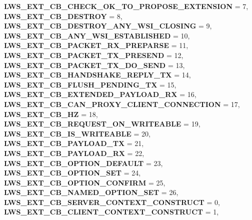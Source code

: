 \begin{DoxyCompactItemize}
{\bfseries L\+W\+S\+\_\+\+E\+X\+T\+\_\+\+C\+B\+\_\+\+C\+H\+E\+C\+K\+\_\+\+O\+K\+\_\+\+T\+O\+\_\+\+P\+R\+O\+P\+O\+S\+E\+\_\+\+E\+X\+T\+E\+N\+S\+I\+ON} = 7, 
{\bfseries L\+W\+S\+\_\+\+E\+X\+T\+\_\+\+C\+B\+\_\+\+D\+E\+S\+T\+R\+OY} = 8, 
{\bfseries L\+W\+S\+\_\+\+E\+X\+T\+\_\+\+C\+B\+\_\+\+D\+E\+S\+T\+R\+O\+Y\+\_\+\+A\+N\+Y\+\_\+\+W\+S\+I\+\_\+\+C\+L\+O\+S\+I\+NG} = 9, 
\newline
{\bfseries L\+W\+S\+\_\+\+E\+X\+T\+\_\+\+C\+B\+\_\+\+A\+N\+Y\+\_\+\+W\+S\+I\+\_\+\+E\+S\+T\+A\+B\+L\+I\+S\+H\+ED} = 10, 
{\bfseries L\+W\+S\+\_\+\+E\+X\+T\+\_\+\+C\+B\+\_\+\+P\+A\+C\+K\+E\+T\+\_\+\+R\+X\+\_\+\+P\+R\+E\+P\+A\+R\+SE} = 11, 
{\bfseries L\+W\+S\+\_\+\+E\+X\+T\+\_\+\+C\+B\+\_\+\+P\+A\+C\+K\+E\+T\+\_\+\+T\+X\+\_\+\+P\+R\+E\+S\+E\+ND} = 12, 
{\bfseries L\+W\+S\+\_\+\+E\+X\+T\+\_\+\+C\+B\+\_\+\+P\+A\+C\+K\+E\+T\+\_\+\+T\+X\+\_\+\+D\+O\+\_\+\+S\+E\+ND} = 13, 
\newline
{\bfseries L\+W\+S\+\_\+\+E\+X\+T\+\_\+\+C\+B\+\_\+\+H\+A\+N\+D\+S\+H\+A\+K\+E\+\_\+\+R\+E\+P\+L\+Y\+\_\+\+TX} = 14, 
{\bfseries L\+W\+S\+\_\+\+E\+X\+T\+\_\+\+C\+B\+\_\+\+F\+L\+U\+S\+H\+\_\+\+P\+E\+N\+D\+I\+N\+G\+\_\+\+TX} = 15, 
{\bfseries L\+W\+S\+\_\+\+E\+X\+T\+\_\+\+C\+B\+\_\+\+E\+X\+T\+E\+N\+D\+E\+D\+\_\+\+P\+A\+Y\+L\+O\+A\+D\+\_\+\+RX} = 16, 
{\bfseries L\+W\+S\+\_\+\+E\+X\+T\+\_\+\+C\+B\+\_\+\+C\+A\+N\+\_\+\+P\+R\+O\+X\+Y\+\_\+\+C\+L\+I\+E\+N\+T\+\_\+\+C\+O\+N\+N\+E\+C\+T\+I\+ON} = 17, 
\newline
{\bfseries L\+W\+S\+\_\+\+E\+X\+T\+\_\+\+C\+B\+\_\+HZ} = 18, 
{\bfseries L\+W\+S\+\_\+\+E\+X\+T\+\_\+\+C\+B\+\_\+\+R\+E\+Q\+U\+E\+S\+T\+\_\+\+O\+N\+\_\+\+W\+R\+I\+T\+E\+A\+B\+LE} = 19, 
{\bfseries L\+W\+S\+\_\+\+E\+X\+T\+\_\+\+C\+B\+\_\+\+I\+S\+\_\+\+W\+R\+I\+T\+E\+A\+B\+LE} = 20, 
{\bfseries L\+W\+S\+\_\+\+E\+X\+T\+\_\+\+C\+B\+\_\+\+P\+A\+Y\+L\+O\+A\+D\+\_\+\+TX} = 21, 
\newline
{\bfseries L\+W\+S\+\_\+\+E\+X\+T\+\_\+\+C\+B\+\_\+\+P\+A\+Y\+L\+O\+A\+D\+\_\+\+RX} = 22, 
{\bfseries L\+W\+S\+\_\+\+E\+X\+T\+\_\+\+C\+B\+\_\+\+O\+P\+T\+I\+O\+N\+\_\+\+D\+E\+F\+A\+U\+LT} = 23, 
{\bfseries L\+W\+S\+\_\+\+E\+X\+T\+\_\+\+C\+B\+\_\+\+O\+P\+T\+I\+O\+N\+\_\+\+S\+ET} = 24, 
{\bfseries L\+W\+S\+\_\+\+E\+X\+T\+\_\+\+C\+B\+\_\+\+O\+P\+T\+I\+O\+N\+\_\+\+C\+O\+N\+F\+I\+RM} = 25, 
\newline
{\bfseries L\+W\+S\+\_\+\+E\+X\+T\+\_\+\+C\+B\+\_\+\+N\+A\+M\+E\+D\+\_\+\+O\+P\+T\+I\+O\+N\+\_\+\+S\+ET} = 26, 
{\bfseries L\+W\+S\+\_\+\+E\+X\+T\+\_\+\+C\+B\+\_\+\+S\+E\+R\+V\+E\+R\+\_\+\+C\+O\+N\+T\+E\+X\+T\+\_\+\+C\+O\+N\+S\+T\+R\+U\+CT} = 0, 
{\bfseries L\+W\+S\+\_\+\+E\+X\+T\+\_\+\+C\+B\+\_\+\+C\+L\+I\+E\+N\+T\+\_\+\+C\+O\+N\+T\+E\+X\+T\+\_\+\+C\+O\+N\+S\+T\+R\+U\+CT} = 1, 

\end{DoxyCompactItemize}
